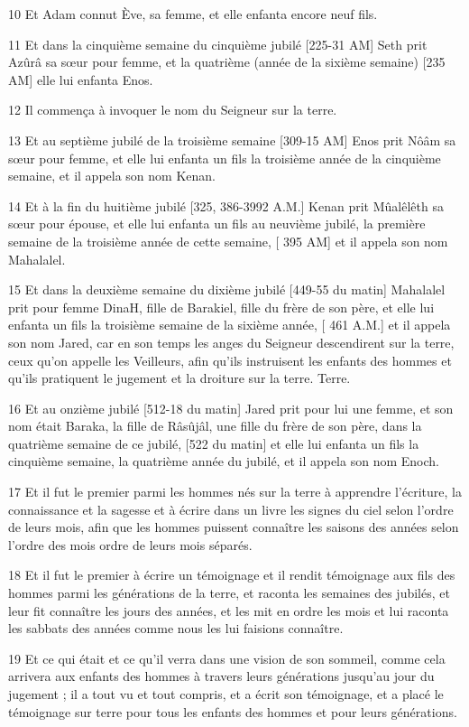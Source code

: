 \par 10 Et Adam connut Ève, sa femme, et elle enfanta encore neuf fils.
\par 11 Et dans la cinquième semaine du cinquième jubilé [225-31 AM] Seth prit Azûrâ sa sœur pour femme, et la quatrième (année de la sixième semaine) [235 AM] elle lui enfanta Enos.
\par 12 Il commença à invoquer le nom du Seigneur sur la terre.
\par 13 Et au septième jubilé de la troisième semaine [309-15 AM] Enos prit Nôâm sa sœur pour femme, et elle lui enfanta un fils la troisième année de la cinquième semaine, et il appela son nom Kenan.
\par 14 Et à la fin du huitième jubilé [325, 386-3992 A.M.] Kenan prit Mûalêlêth sa sœur pour épouse, et elle lui enfanta un fils au neuvième jubilé, la première semaine de la troisième année de cette semaine, [ 395 AM] et il appela son nom Mahalalel.
\par 15 Et dans la deuxième semaine du dixième jubilé [449-55 du matin] Mahalalel prit pour femme DinaH, fille de Barakiel, fille du frère de son père, et elle lui enfanta un fils la troisième semaine de la sixième année, [ 461 A.M.] et il appela son nom Jared, car en son temps les anges du Seigneur descendirent sur la terre, ceux qu'on appelle les Veilleurs, afin qu'ils instruisent les enfants des hommes et qu'ils pratiquent le jugement et la droiture sur la terre. Terre.
\par 16 Et au onzième jubilé [512-18 du matin] Jared prit pour lui une femme, et son nom était Baraka, la fille de Râsûjâl, une fille du frère de son père, dans la quatrième semaine de ce jubilé, [522 du matin] et elle lui enfanta un fils la cinquième semaine, la quatrième année du jubilé, et il appela son nom Enoch.
\par 17 Et il fut le premier parmi les hommes nés sur la terre à apprendre l'écriture, la connaissance et la sagesse et à écrire dans un livre les signes du ciel selon l'ordre de leurs mois, afin que les hommes puissent connaître les saisons des années selon l'ordre des mois ordre de leurs mois séparés.
\par 18 Et il fut le premier à écrire un témoignage et il rendit témoignage aux fils des hommes parmi les générations de la terre, et raconta les semaines des jubilés, et leur fit connaître les jours des années, et les mit en ordre les mois et lui raconta les sabbats des années comme nous les lui faisions connaître.
\par 19 Et ce qui était et ce qu'il verra dans une vision de son sommeil, comme cela arrivera aux enfants des hommes à travers leurs générations jusqu'au jour du jugement ; il a tout vu et tout compris, et a écrit son témoignage, et a placé le témoignage sur terre pour tous les enfants des hommes et pour leurs générations.
